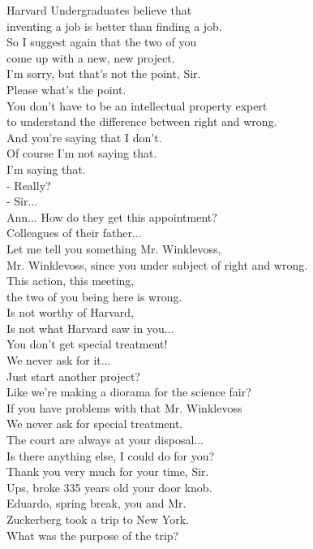\documentclass{article}
\begin{document}
\begin{multicols}{3}
Harvard Undergraduates believe that\\
inventing a job is better than finding a job.\\
So I suggest again that the two of you\\
come up with a new, new project.\\
I'm sorry, but that's not the point, Sir.\\
Please what's the point.\\
You don't have to be an intellectual property expert\\
to understand the difference between right and wrong.\\
And you're saying that I don't.\\
Of course I'm not saying that.\\
I'm saying that.\\
- Really?\\
- Sir...\\
Ann... How do they get this appointment?\\
Colleagues of their father...\\
Let me tell you something Mr. Winklevoss,\\
Mr. Winklevoss, since you under subject of right and wrong.\\
This action, this meeting,\\
the two of you being here is wrong.\\
Is not worthy of Harvard,\\
Is not what Harvard saw in you...\\
You don't get special treatment!\\
We never ask for it...\\
Just start another project?\\
Like we're making a diorama for the science fair?\\
If you have problems with that Mr. Winklevoss\\
We never ask for special treatment.\\
The court are always at your disposal...\\
Is there anything else, I could do for you?\\
Thank you very much for your time, Sir.\\
Ups, broke 335 years old your door knob.\\
Eduardo, spring break, you and Mr.\\
Zuckerberg took a trip to New York.\\
What was the purpose of the trip?\\

\end{multicols}
\end{document}
